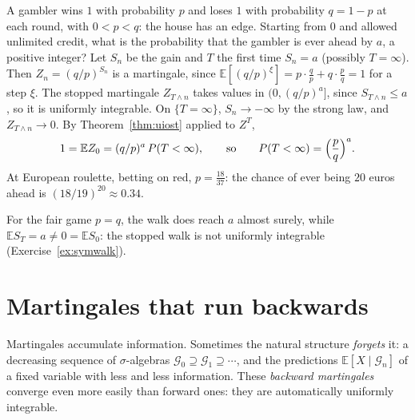 \begin{example}\label{ex:biasedruin}
A gambler wins $1$ with probability $p$ and loses $1$ with probability $q=1-p$ at each round, with $0<p<q$: the house has an edge. Starting from $0$ and allowed unlimited credit, what is the
probability that the gambler is ever ahead by $a$, a positive integer? Let $S_n$ be the gain and $T$ the first time $S_n=a$ (possibly $T=\infty$). Then $Z_n=(q/p)^{S_n}$ is a martingale,
since $\mathbb E[(q/p)^{\xi}]=p\cdot\frac qp+q\cdot\frac pq=1$ for a step $\xi$. The stopped martingale $Z_{T\wedge n}$ takes values in $(0,(q/p)^a]$, since $S_{T\wedge n}\le a$, so it is
uniformly integrable. On $\{T=\infty\}$, $S_n\to-\infty$ by the strong law, and $Z_{T\wedge n}\to0$. By Theorem~\ref{thm:uiost} applied to $Z^T$,
\[
1=\mathbb EZ_0=(q/p)^a\,P(T<\infty),\qquad\text{so}\qquad P(T<\infty)=\Bigl(\frac pq\Bigr)^a.
\]
At European roulette, betting on red, $p=\frac{18}{37}$: the chance of ever being $20$ euros ahead is $(18/19)^{20}\approx0.34$.
\end{example}

For the fair game $p=q$, the walk does reach $a$ almost surely, while $\mathbb ES_T=a\neq0=\mathbb ES_0$: the stopped walk is not uniformly integrable (Exercise~\ref{ex:symwalk}).

\section{Martingales that run backwards}

Martingales accumulate information. Sometimes the natural structure \emph{forgets} it: a decreasing sequence of $\sigma$-algebras $\mathcal G_0\supseteq\mathcal G_1\supseteq\cdots$, and
the predictions $\mathbb E[X\mid\mathcal G_n]$ of a fixed variable with less and less information. These \emph{backward martingales} converge even more easily than forward ones: they are
automatically uniformly integrable.

